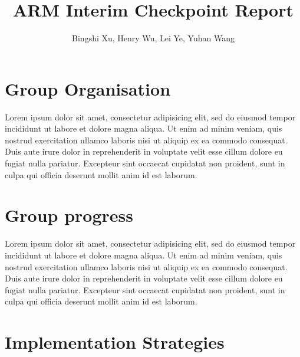 \documentclass[11pt]{article}
\begin{document}
\title{ARM Interim Checkpoint Report}
\author{Bingshi Xu, Henry Wu, Lei Ye, Yuhan Wang}

\maketitle


\section{Group Organisation}

Lorem ipsum dolor sit amet, consectetur adipisicing elit, sed do eiusmod tempor
incididunt ut labore et dolore magna aliqua. Ut enim ad minim veniam, quis
nostrud exercitation ullamco laboris nisi ut aliquip ex ea commodo consequat.
Duis aute irure dolor in reprehenderit in voluptate velit esse cillum dolore eu
fugiat nulla pariatur. Excepteur sint occaecat cupidatat non proident, sunt in
culpa qui officia deserunt mollit anim id est laborum.

\section{Group progress}
Lorem ipsum dolor sit amet, consectetur adipisicing elit, sed do eiusmod tempor
incididunt ut labore et dolore magna aliqua. Ut enim ad minim veniam, quis
nostrud exercitation ullamco laboris nisi ut aliquip ex ea commodo consequat.
Duis aute irure dolor in reprehenderit in voluptate velit esse cillum dolore eu
fugiat nulla pariatur. Excepteur sint occaecat cupidatat non proident, sunt in
culpa qui officia deserunt mollit anim id est laborum.

\section{Implementation Strategies}
\end{document}
